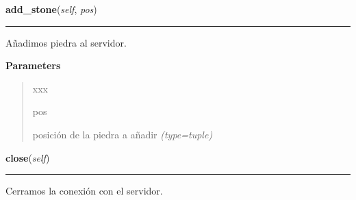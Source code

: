     \label{src:igs:Igs:add_stone}

    \vspace{0.5ex}

\hspace{.8\funcindent}\begin{boxedminipage}{\funcwidth}

    \raggedright \textbf{add\_stone}(\textit{self}, \textit{pos})

    \vspace{-1.5ex}

    \rule{\textwidth}{0.5\fboxrule}
\setlength{\parskip}{2ex}
Añadimos piedra al servidor.

\setlength{\parskip}{1ex}
      \textbf{Parameters}
      \vspace{-1ex}

      \begin{quote}
        \begin{Ventry}{xxx}

          \item[pos]


posición de la piedra a añadir
            {\it (type=tuple)}

        \end{Ventry}

      \end{quote}

    \end{boxedminipage}

    \label{src:igs:Igs:close}

    \vspace{0.5ex}

\hspace{.8\funcindent}\begin{boxedminipage}{\funcwidth}

    \raggedright \textbf{close}(\textit{self})

    \vspace{-1.5ex}

    \rule{\textwidth}{0.5\fboxrule}
\setlength{\parskip}{2ex}

Cerramos la conexión con el servidor.
\setlength{\parskip}{1ex}
    \end{boxedminipage}

